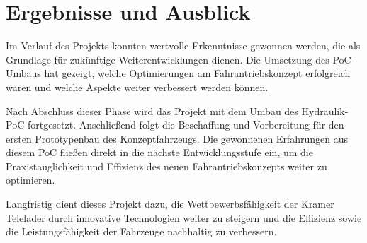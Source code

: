 \documentclass[a4paper, 12pt]{article} %
\begin{document}
\section{Ergebnisse und Ausblick}
\begin{spacing}{1.5}  %
    \fontsize{14pt}{14pt}\selectfont  %
    Im Verlauf des Projekts konnten wertvolle Erkenntnisse gewonnen werden, die als Grundlage für zukünftige Weiterentwicklungen dienen. 
    Die Umsetzung des \acf{PoC}-Umbaus hat gezeigt, welche Optimierungen am Fahrantriebskonzept erfolgreich waren und welche
     Aspekte weiter verbessert werden können.

    Nach Abschluss dieser Phase wird das Projekt mit dem Umbau des Hydraulik-\acs{PoC} fortgesetzt. Anschließend 
    folgt die Beschaffung und Vorbereitung für den ersten Prototypenbau des Konzeptfahrzeugs. Die gewonnenen 
    Erfahrungen aus diesem \acs{PoC} fließen direkt in die nächste Entwicklungsstufe ein, um die Praxistauglichkeit und Effizienz 
    des neuen Fahrantriebskonzepts weiter zu optimieren.
    
    Langfristig dient dieses Projekt dazu, die Wettbewerbsfähigkeit der Kramer Telelader durch innovative 
    Technologien weiter zu steigern und die Effizienz sowie die Leistungsfähigkeit der Fahrzeuge nachhaltig
     zu verbessern.
\end{spacing}

\clearpage

\begingroup
\renewcommand{\bibfont}{\fontsize{13pt}{12pt}\selectfont}  
\sloppy
\nocite{*}
\printbibliography{}
\end{document}
